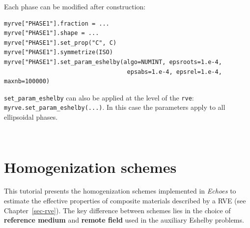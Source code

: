 \documentclass[
  a4paper,
  numbers=noendperiod,
  DIV=12]{scrreprt}
\begin{document}
Each phase can be modified after construction:

\begin{verbatim}
myrve["PHASE1"].fraction = ...
myrve["PHASE1"].shape = ...
myrve["PHASE1"].set_prop("C", C)
myrve["PHASE1"].symmetrize(ISO)
myrve["PHASE1"].set_param_eshelby(algo=NUMINT, epsroots=1.e-4,
                                   epsabs=1.e-4, epsrel=1.e-4, maxnb=100000)
\end{verbatim}

\begin{tcolorbox}[enhanced jigsaw, arc=.35mm, bottomrule=.15mm, bottomtitle=1mm, breakable, colback=white, colbacktitle=quarto-callout-tip-color!10!white, colframe=quarto-callout-tip-color-frame, coltitle=black, left=2mm, leftrule=.75mm, opacityback=0, opacitybacktitle=0.6, rightrule=.15mm, title=\textcolor{quarto-callout-tip-color}{\faLightbulb}\hspace{0.5em}{Tip}, titlerule=0mm, toprule=.15mm, toptitle=1mm]

\texttt{set\_param\_eshelby} can also be applied at the level of the
\texttt{rve}: \texttt{myrve.set\_param\_eshelby(...)}. In this case the
parameters apply to all ellipsoidal phases.

\end{tcolorbox}

\(\,\)

\chapter{Homogenization schemes}\label{sec-schemes}

\begin{tcolorbox}[enhanced jigsaw, arc=.35mm, bottomrule=.15mm, bottomtitle=1mm, breakable, colback=white, colbacktitle=quarto-callout-important-color!10!white, colframe=quarto-callout-important-color-frame, coltitle=black, left=2mm, leftrule=.75mm, opacityback=0, opacitybacktitle=0.6, rightrule=.15mm, title={Objectives}, titlerule=0mm, toprule=.15mm, toptitle=1mm]

This tutorial presents the homogenization schemes implemented in
\emph{Echoes} to estimate the effective properties of composite
materials described by a RVE (see Chapter~\ref{sec-rve}). The key
difference between schemes lies in the choice of \textbf{reference
medium} and \textbf{remote field} used in the auxiliary Eshelby
problems.

\end{tcolorbox}
\end{document}
